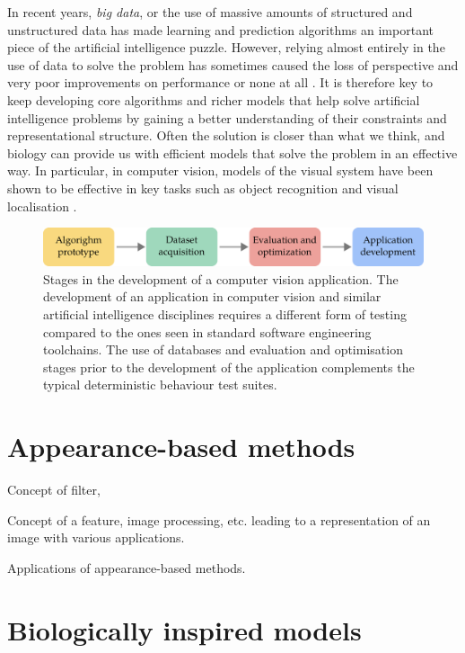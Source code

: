 In recent years, \textit{big data}, or the use of massive amounts of structured and unstructured data has made learning and prediction algorithms an important piece of the artificial intelligence puzzle. However, relying almost entirely in the use of data to solve the problem has sometimes caused the loss of perspective and very poor improvements on performance or none at all \cite{zhu2012we}. It is therefore key to keep developing core algorithms and richer models that help solve artificial intelligence problems by gaining a better understanding of their constraints and representational structure. Often the solution is closer than what we think, and biology can provide us with efficient models that solve the problem in an effective way. In particular, in computer vision, models of the visual system have been shown to be effective in key tasks such as object recognition and visual localisation \cite{lowe2004distinctive,milford2004ratslam}. 


\begin{figure}
\centering
\includegraphics[width=\linewidth]{gfx/Chapter01/cv_dev_pipeline.pdf}
\caption{Stages in the development of a computer vision application. The development of an application in computer vision and similar artificial intelligence disciplines requires a different form of testing compared to the ones seen in standard software engineering toolchains. The use of databases and evaluation and optimisation stages prior to the development of the application complements the typical deterministic behaviour test suites.}
\label{fig:cv_dev_pipeline}
\end{figure}

\section{Appearance-based methods}

Concept of filter,

Concept of a feature, image processing, etc. leading to a representation of an image with various applications.

Applications of appearance-based methods.


\section{Biologically inspired models} 

